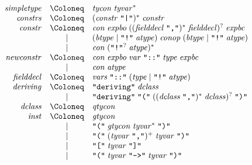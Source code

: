 \begin{align*}
  \begin{array}{rcl}
    \mathit{simpletype}
    & \Coloneq & \mathit{tycon}\; \mathit{tyvar}^* \\
    \mathit{constrs}
    & \Coloneq & (\mathit{constr}\; \text{\texttt{\textquotedbl|\textquotedbl}})^*\; \mathit{constr} \\
    \mathit{constr}
    & \Coloneq & \mathit{con}\; \mathit{expbo}\; ((\mathit{fielddecl}\; \text{\texttt{\textquotedbl,\textquotedbl}})^*\; \mathit{fielddecl})^?\; \mathit{expbc} \\
    & \mid & (\mathit{btype} \mid \text{\texttt{\textquotedbl!\textquotedbl}}\; \mathit{atype})\; \mathit{conop}\; (\mathit{btype} \mid \text{\texttt{\textquotedbl!\textquotedbl}}\; \mathit{atype}) \\
    & \mid & \mathit{con}\; (\text{\texttt{\textquotedbl!\textquotedbl}}^?\; \mathit{atype})^* \\
    \mathit{newconstr}
    & \Coloneq & \mathit{con}\; \mathit{expbo}\; \mathit{var}\; \text{\texttt{\textquotedbl ::\textquotedbl}}\; \mathit{type}\; \mathit{expbc} \\
    & \mid & \mathit{con}\; \mathit{atype} \\
    \mathit{fielddecl}
    & \Coloneq & \mathit{vars}\; \text{\texttt{\textquotedbl ::\textquotedbl}}\; (\mathit{type} \mid \text{\texttt{\textquotedbl !\textquotedbl}}\; \mathit{atype}) \\
    \mathit{deriving}
    & \Coloneq & \text{\texttt{\textquotedbl deriving\textquotedbl}}\; \mathit{dclass} \\
    & \mid & \text{\texttt{\textquotedbl deriving\textquotedbl}}\; \text{\texttt{\textquotedbl(\textquotedbl}}\; ((\mathit{dclass}\; \text{\texttt{\textquotedbl,\textquotedbl}})^*\; \mathit{dclass})^?\; \text{\texttt{\textquotedbl)\textquotedbl}} \\
    \mathit{dclass}
    & \Coloneq & \mathit{qtycon} \\
    \mathit{inst}
    & \Coloneq & \mathit{gtycon} \\
    & \mid & \text{\texttt{\textquotedbl(\textquotedbl}}\; \mathit{gtycon}\; \mathit{tyvar}^*\; \text{\texttt{\textquotedbl)\textquotedbl}} \\
    & \mid & \text{\texttt{\textquotedbl(\textquotedbl}}\; (\mathit{tyvar}\; \text{\texttt{\textquotedbl,\textquotedbl}})^+\; \mathit{tyvar}\; \text{\texttt{\textquotedbl)\textquotedbl}} \\
    & \mid & \text{\texttt{\textquotedbl[\textquotedbl}}\; \mathit{tyvar}\; \text{\texttt{\textquotedbl]\textquotedbl}} \\
    & \mid & \text{\texttt{\textquotedbl(\textquotedbl}}\; \mathit{tyvar}\; \text{\texttt{\textquotedbl ->\textquotedbl}}\; \mathit{tyvar}\; \text{\texttt{\textquotedbl)\textquotedbl}}
  \end{array}
\end{align*}

